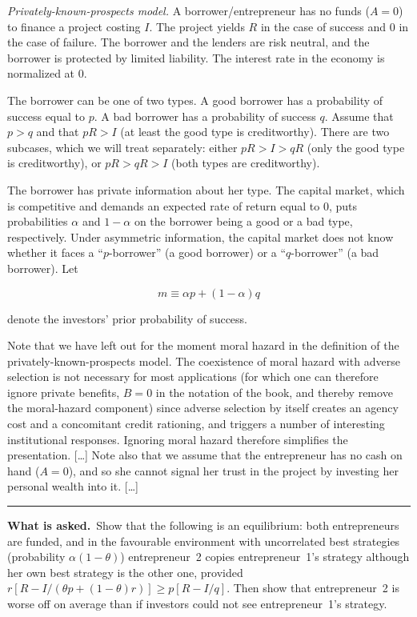 \documentclass[11pt,a4paper]{article}
\newcommand{\asked}{\par\medskip\noindent\textbf{What is asked.}~}
\newcommand{\stmtend}{\par\endgroup\nopagebreak\noindent\rule{\linewidth}{0.4pt}\par\medskip}
\begin{document}
\emph{Privately-known-prospects model.} A borrower/entrepreneur has no funds (\(A = 0\)) to finance
a project costing \(I\). The project yields \(R\) in the case of success and 0 in the case of
failure. The borrower and the lenders are risk neutral, and the borrower is protected by limited
liability. The interest rate in the economy is normalized at 0.

The borrower can be one of two types. A good borrower has a probability of success equal to \(p\). A
bad borrower has a probability of success \(q\). Assume that \(p > q\) and that \(pR > I\) (at least
the good type is creditworthy). There are two subcases, which we will treat separately: either
\(pR > I > qR\) (only the good type is creditworthy), or \(pR > qR > I\) (both types are
creditworthy).

The borrower has private information about her type. The capital market, which is competitive and
demands an expected rate of return equal to 0, puts probabilities \(\alpha\) and \(1 - \alpha\) on
the borrower being a good or a bad type, respectively. Under asymmetric information, the capital
market does not know whether it faces a ``\(p\)-borrower'' (a good borrower) or a ``\(q\)-borrower''
(a bad borrower). Let

\[m \equiv \alpha p + (1 - \alpha) q\]

denote the investors' prior probability of success.

Note that we have left out for the moment moral hazard in the definition of the
privately-known-prospects model. The coexistence of moral hazard with adverse selection is not
necessary for most applications (for which one can therefore ignore private benefits, \(B = 0\) in
the notation of the book, and thereby remove the moral-hazard component) since adverse selection by
itself creates an agency cost and a concomitant credit rationing, and triggers a number of
interesting institutional responses. Ignoring moral hazard therefore simplifies the presentation.
{[}\ldots{]} Note also that we assume that the entrepreneur has no cash on hand (\(A = 0\)), and so
she cannot signal her trust in the project by investing her personal wealth into it. {[}\ldots{]}
\stmtend

\asked Show that the following is an equilibrium: both entrepreneurs are funded, and in the favourable environment with uncorrelated best strategies (probability $\alpha(1-\theta)$) entrepreneur~2 copies entrepreneur~1's strategy although her own best strategy is the other one, provided $r[R-I/(\theta p+(1-\theta)r)]\ge p[R-I/q]$. Then show that entrepreneur~2 is worse off on average than if investors could not see entrepreneur~1's strategy.
\end{document}
